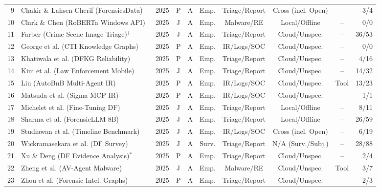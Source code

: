 \begin{table}[!t]
\begin{tabular}{rlcccccccr}
9 & Chakir \& Lahsen-Cherif (ForensicsData)~\cite{chakir2025_forensicsdata} & 2025 & P & A & Emp. & Triage/Report & Cross (incl. Open) & -- & 3/4 \\
10 & Clark \& Chen (RoBERTa Windows API)~\cite{clark2025_large} & 2025 & J & A & Emp. & Malware/RE & Local/Offline & -- & 0/0 \\
11 & Farber (Crime Scene Image Triage)$^\dagger$~\cite{farber2025_scpaiscp} & 2025 & J & A & Emp. & Triage/Report & Cloud/Unspec. & -- & 36/53 \\
12 & George et al. (CTI Knowledge Graphs)~\cite{george2025_llm} & 2025 & P & A & Emp. & IR/Logs/SOC & Cloud/Unspec. & -- & 0/0 \\
13 & Khatiwala et al. (DFKG Reliability)~\cite{khatiwala2025_evaluating} & 2025 & P & A & Emp. & Triage/Report & Cloud/Unspec. & -- & 4/16 \\
14 & Kim et al. (Law Enforcement Mobile)~\cite{kim2025_digital} & 2025 & J & A & Emp. & Triage/Report & Cloud/Unspec. & -- & 14/32 \\
15 & Liu (AutoBnB Multi-Agent IR)~\cite{liu2025_autobnb} & 2025 & P & A & Emp. & IR/Logs/SOC & Cloud/Unspec. & Tool & 13/23 \\
16 & Matsuda et al. (Sigma MCP IR)~\cite{matsuda2025_enhancing} & 2025 & P & A & Emp. & IR/Logs/SOC & Cloud/Unspec. & -- & 1/1 \\
17 & Michelet et al. (Fine-Tuning DF)~\cite{michelet2025_finetuning} & 2025 & J & A & Emp. & Triage/Report & Local/Offline & -- & 8/11 \\
18 & Sharma et al. (ForensicLLM 8B)~\cite{sharma2025_forensicllm} & 2025 & J & A & Emp. & Triage/Report & Local/Offline & -- & 26/59 \\
19 & Studiawan et al. (Timeline Benchmark)~\cite{studiawan2025_towards} & 2025 & J & A & Emp. & IR/Logs/SOC & Cross (incl. Open) & -- & 6/19 \\
20 & Wickramasekara et al. (DF Survey)~\cite{wickramasekara2025_exploring} & 2025 & J & A & Surv. & Triage/Report & N/A (Surv./Subj.) & -- & 28/88 \\
21 & Xu \& Deng (DF Evidence Analysis)$^*$~\cite{xu2025_enhancing} & 2025 & P & A & Emp. & Triage/Report & Cloud/Unspec. & -- & 2/4 \\
22 & Zheng et al. (AV-Agent Malware)~\cite{zheng2025_avagent} & 2025 & J & A & Emp. & Malware/RE & Cloud/Unspec. & Tool & 3/7 \\
23 & Zhou et al. (Forensic Intel. Graphs)~\cite{zhou2025_forensic} & 2025 & P & A & Emp. & Triage/Report & Cloud/Unspec. & -- & 2/3 \\

\end{tabular}
\end{table}

